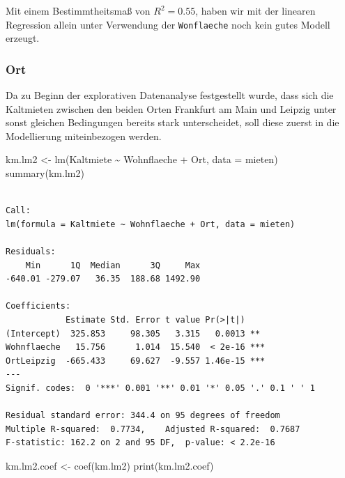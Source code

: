 \documentclass[
  a4paper,
  DIV=11]{scrartcl}
\newenvironment{Shaded}{\begin{snugshade}}{\end{snugshade}}
\newcommand{\AttributeTok}[1]{\textcolor[rgb]{0.40,0.45,0.13}{#1}}
\newcommand{\FunctionTok}[1]{\textcolor[rgb]{0.28,0.35,0.67}{#1}}
\newcommand{\NormalTok}[1]{\textcolor[rgb]{0.00,0.23,0.31}{#1}}
\newcommand{\OtherTok}[1]{\textcolor[rgb]{0.00,0.23,0.31}{#1}}
\newcommand{\SpecialCharTok}[1]{\textcolor[rgb]{0.37,0.37,0.37}{#1}}
\begin{document}
Mit einem Bestimmtheitsmaß von \(R^2 = 0.55\), haben wir mit der
linearen Regression allein unter Verwendung der \texttt{Wonflaeche} noch
kein gutes Modell erzeugt.

\hypertarget{ort}{%
\subsubsection{Ort}\label{ort}}

Da zu Beginn der explorativen Datenanalyse festgestellt wurde, dass sich
die Kaltmieten zwischen den beiden Orten Frankfurt am Main und Leipzig
unter sonst gleichen Bedingungen bereits stark unterscheidet, soll diese
zuerst in die Modellierung miteinbezogen werden.

\begin{Shaded}
\begin{Highlighting}[]
\NormalTok{km.lm2 }\OtherTok{\textless{}{-}} \FunctionTok{lm}\NormalTok{(Kaltmiete }\SpecialCharTok{\textasciitilde{}}\NormalTok{ Wohnflaeche }\SpecialCharTok{+}\NormalTok{ Ort, }\AttributeTok{data =}\NormalTok{ mieten)}
\FunctionTok{summary}\NormalTok{(km.lm2)}
\end{Highlighting}
\end{Shaded}

\begin{verbatim}

Call:
lm(formula = Kaltmiete ~ Wohnflaeche + Ort, data = mieten)

Residuals:
    Min      1Q  Median      3Q     Max 
-640.01 -279.07   36.35  188.68 1492.90 

Coefficients:
            Estimate Std. Error t value Pr(>|t|)    
(Intercept)  325.853     98.305   3.315   0.0013 ** 
Wohnflaeche   15.756      1.014  15.540  < 2e-16 ***
OrtLeipzig  -665.433     69.627  -9.557 1.46e-15 ***
---
Signif. codes:  0 '***' 0.001 '**' 0.01 '*' 0.05 '.' 0.1 ' ' 1

Residual standard error: 344.4 on 95 degrees of freedom
Multiple R-squared:  0.7734,    Adjusted R-squared:  0.7687 
F-statistic: 162.2 on 2 and 95 DF,  p-value: < 2.2e-16
\end{verbatim}

\begin{Shaded}
\begin{Highlighting}[]
\NormalTok{km.lm2.coef }\OtherTok{\textless{}{-}} \FunctionTok{coef}\NormalTok{(km.lm2)}
\FunctionTok{print}\NormalTok{(km.lm2.coef)}
\end{Highlighting}
\end{Shaded}
\end{document}
